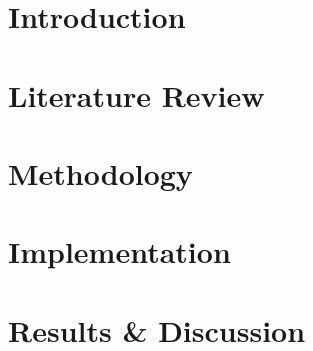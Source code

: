 \documentclass[harvard]{lincolncsthesis}
\begin{document}

\maketitle

%





\thesisTables
\thesisBodyStart



\chapter{Introduction}

 
\chapter{Literature Review}


\chapter{Methodology}



\chapter{Implementation}


\chapter{Results \& Discussion}

\end{document}

